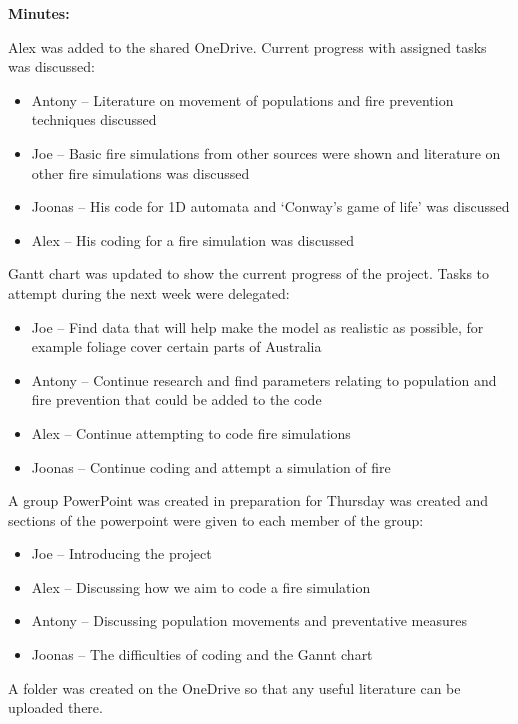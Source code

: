\textbf{Minutes:}

Alex was added to the shared OneDrive. Current progress with assigned tasks was discussed:

\begin{itemize}
    \item Antony – Literature on movement of populations and fire prevention techniques discussed
    \item Joe – Basic fire simulations from other sources were shown and literature on other fire simulations was discussed
    \item Joonas – His code for 1D automata and ‘Conway’s game of life’ was discussed
    \item Alex – His coding for a fire simulation was discussed
\end{itemize}

Gantt chart was updated to show the current progress of the project. Tasks to attempt during the next week were delegated:

\begin{itemize}
    \item Joe – Find data that will help make the model as realistic as possible, for example foliage cover certain parts of Australia
    \item Antony – Continue research and find parameters relating to population and fire prevention that could be added to the code
    \item Alex – Continue attempting to code fire simulations
    \item Joonas – Continue coding and attempt a simulation of fire
\end{itemize}

A group PowerPoint was created in preparation for Thursday was created and sections of the powerpoint were given to each member of the group:

\begin{itemize}
    \item Joe – Introducing the project
    \item Alex – Discussing how we aim to code a fire simulation
    \item Antony – Discussing population movements and preventative measures 
    \item Joonas – The difficulties of coding and the Gannt chart
\end{itemize}

A folder was created on the OneDrive so that any useful literature can be uploaded there.

